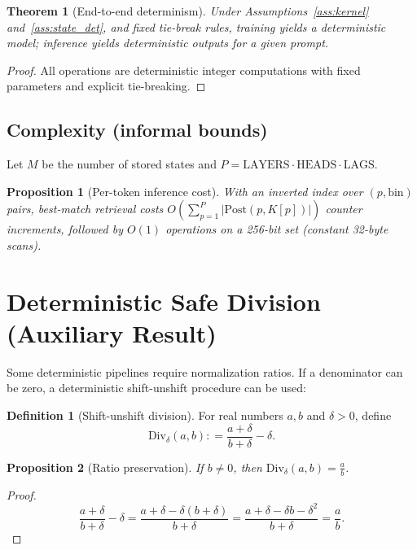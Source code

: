 \documentclass[11pt,a4paper]{article}
\theoremstyle{definition}
\newtheorem{definition}{Definition}[section]
\theoremstyle{plain}
\newtheorem{theorem}{Theorem}[section]
\newtheorem{proposition}{Proposition}[section]
\theoremstyle{remark}
\newcommand{\abs}[1]{\left\lvert #1 \right\rvert}
\newcommand{\defeq}{\mathrel{\mathop:}=}
\begin{document}
\begin{theorem}[End-to-end determinism]\label{thm:end2end}
Under Assumptions~\ref{ass:kernel} and~\ref{ass:state_det}, and fixed tie-break rules,
training yields a deterministic model; inference yields deterministic outputs for a given prompt.
\end{theorem}
\begin{proof}
All operations are deterministic integer computations with fixed parameters and explicit tie-breaking.
\end{proof}

\subsection{Complexity (informal bounds)}
Let $M$ be the number of stored states and $P=\mathrm{LAYERS}\cdot\mathrm{HEADS}\cdot\mathrm{LAGS}$.

\begin{proposition}[Per-token inference cost]\label{prop:cost}
With an inverted index over $(p,\mathrm{bin})$ pairs, best-match retrieval costs
$O\!\left(\sum_{p=1}^{P} \abs{\mathrm{Post}(p,K[p])}\right)$ counter increments,
followed by $O(1)$ operations on a 256-bit set (constant 32-byte scans).
\end{proposition}

\section{Deterministic Safe Division (Auxiliary Result)}
Some deterministic pipelines require normalization ratios. If a denominator can be zero,
a deterministic shift-unshift procedure can be used:

\begin{definition}[Shift-unshift division]\label{def:shiftunshift}
For real numbers $a,b$ and $\delta>0$, define
\[
\mathrm{Div}_\delta(a,b) \defeq \frac{a+\delta}{b+\delta} - \delta.
\]
\end{definition}

\begin{proposition}[Ratio preservation]\label{prop:ratio_preserve}
If $b\neq 0$, then $\mathrm{Div}_\delta(a,b)=\frac{a}{b}$.
\end{proposition}
\begin{proof}
\[
\frac{a+\delta}{b+\delta}-\delta
= \frac{a+\delta - \delta(b+\delta)}{b+\delta}
= \frac{a+\delta -\delta b -\delta^2}{b+\delta}
= \frac{a}{b}.
\]
\end{proof}
\end{document}
